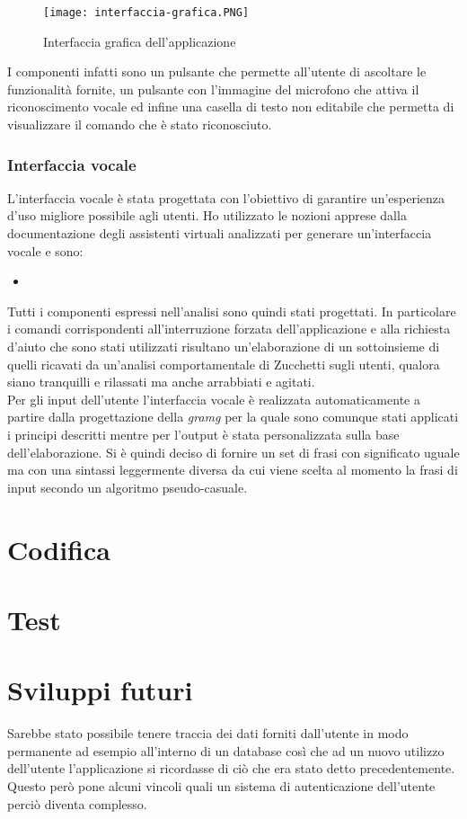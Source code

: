 		\begin{figure}[htbp]
			\begin{center}
				\texttt{[image: interfaccia-grafica.PNG]}
				\caption{Interfaccia grafica dell'applicazione}
			\end{center}
		\end{figure}
	
		I componenti infatti sono un pulsante che permette all'utente di ascoltare le funzionalità fornite, un pulsante con l'immagine del microfono che attiva il riconoscimento vocale ed infine una casella di testo non editabile che permetta di visualizzare il comando che è stato riconosciuto.		
		\subsubsection{Interfaccia vocale}
		L'interfaccia vocale è stata progettata con l'obiettivo di garantire un'esperienza d'uso migliore possibile agli utenti. Ho utilizzato le nozioni apprese dalla documentazione degli assistenti virtuali analizzati per generare un'interfaccia vocale e sono:
		\begin{itemize}
			\item %
		\end{itemize}		
		Tutti i componenti espressi nell'analisi sono quindi stati progettati. In particolare i comandi corrispondenti all'interruzione forzata dell'applicazione e alla richiesta d'aiuto che sono stati utilizzati risultano un'elaborazione di un sottoinsieme di quelli ricavati da un'analisi comportamentale di Zucchetti sugli utenti, qualora siano tranquilli e rilassati ma anche arrabbiati e agitati. \\
		Per gli input dell'utente l'interfaccia vocale è realizzata automaticamente a partire dalla progettazione della \emph{\gls{gramg}} per la quale sono comunque stati applicati i principi descritti mentre per l'output è stata personalizzata sulla base dell'elaborazione. Si è quindi deciso di fornire un set di frasi con significato uguale ma con una sintassi leggermente diversa da cui viene scelta al momento la frasi di input secondo un algoritmo pseudo-casuale.
\section{Codifica}

\section{Test}

\section{Sviluppi futuri}
Sarebbe stato possibile tenere traccia dei dati forniti dall'utente in modo permanente ad esempio all'interno di un database così che ad un nuovo utilizzo dell'utente l'applicazione si ricordasse di ciò che era stato detto precedentemente. Questo però pone alcuni vincoli quali un sistema di autenticazione dell'utente perciò diventa complesso.